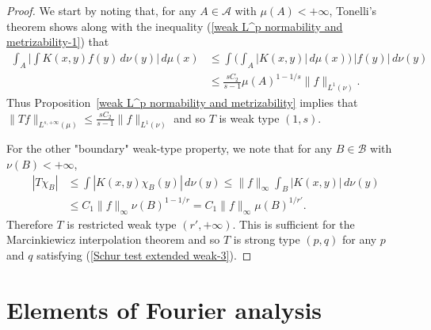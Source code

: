 \begin{proof}
We start by noting that, for any $A\in\mathcal{A}$ with $\mu(A)<+\infty$, Tonelli's theorem shows along with the inequality (\ref{weak L^p normability and metrizability-1}) that
\begin{align*}
\int_A\Big|\int K(x,y)f(y)\,d\nu(y)\Big|\,d\mu(x)&\leq\int\Big(\int_A|K(x,y)|\,d\mu(x)\Big)\,|f(y)|\,d\nu(y)\\
&\leq\frac{sC_2}{s-1}\mu(A)^{1-1/s}\|f\|_{L^1(\nu)}.
\end{align*}
Thus Proposition~\ref{weak L^p normability and metrizability} implies that $\|Tf\|_{L^{s,+\infty}(\mu)}\leq\frac{sC_2}{s-1}\|f\|_{L^1(\nu)}$ and so $T$ is weak 
type $(1,s)$.\par
For the other "boundary" weak-type property, we note that for any $B\in\mathcal{B}$ with $\nu(B)<+\infty$,
\begin{align*}
|T\chi_B|&\leq\int|K(x,y)\chi_B(y)|\,d\nu(y)\leq\|f\|_{\infty}\int_{B}|K(x,y)|\,d\nu(y)\\
&\leq C_1\|f\|_\infty\nu(B)^{1-1/r}=C_1\|f\|_{\infty}\mu(B)^{1/r'}.
\end{align*}
Therefore $T$ is restricted weak type $(r',+\infty)$. This is sufficient for the Marcinkiewicz interpolation theorem and so $T$ is strong type $(p,q)$ for any $p$ and $q$ satisfying (\ref{Schur test extended weak-3}).
\end{proof}
\newpage
\chapter{Elements of Fourier analysis}
